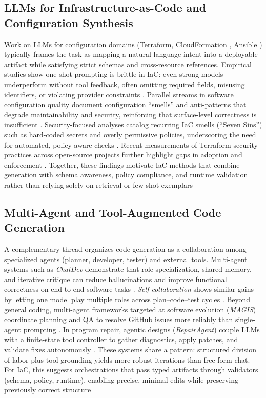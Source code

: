 \documentclass[acmsmall,screen,review,anonymous]{acmart}
\begin{document}
\subsection{LLMs for Infrastructure-as-Code and Configuration Synthesis}
Work on LLMs for configuration domains (Terraform\cite{shirinkin2017getting}, CloudFormation \cite{tovmasyan2020mastering}, Ansible \cite{mcallister2017implementing}) typically frames the task as mapping a natural-language intent into a deployable artifact while satisfying strict schemas and cross-resource references. Empirical studies show one-shot prompting is brittle in IaC: even strong models underperform without tool feedback, often omitting required fields, misusing identifiers, or violating provider constraints \cite{kon2024iac}. Parallel streams in software configuration quality document configuration ``smells'' and anti-patterns that degrade maintainability and security, reinforcing that surface-level correctness is insufficient \cite{sharma2016does,schwarz2018code}. Security-focused analyses catalog recurring IaC smells (``Seven Sins'') such as hard-coded secrets and overly permissive policies, underscoring the need for automated, policy-aware checks \cite{opara2025chaos}. Recent measurements of Terraform security practices across open-source projects further highlight gaps in adoption and enforcement \cite{verdet2023exploring}. Together, these findings motivate IaC methods that combine generation with schema awareness, policy compliance, and runtime validation rather than relying solely on retrieval or few-shot exemplars

\subsection{Multi-Agent and Tool-Augmented Code Generation}
A complementary thread organizes code generation as a collaboration among specialized agents (planner, developer, tester) and external tools. Multi-agent systems such as \emph{ChatDev} demonstrate that role specialization, shared memory, and iterative critique can reduce hallucinations and improve functional correctness on end-to-end software tasks \cite{qian2023chatdev}. \emph{Self-collaboration} shows similar gains by letting one model play multiple roles across plan–code–test cycles \cite{dong2024self}. Beyond general coding, multi-agent frameworks targeted at software evolution (\emph{MAGIS}) coordinate planning and QA to resolve GitHub issues more reliably than single-agent prompting \cite{tao2024magis}. In program repair, agentic designs (\emph{RepairAgent}) couple LLMs with a finite-state tool controller to gather diagnostics, apply patches, and validate fixes autonomously \cite{bouzenia2024repairagent}. These systems share a pattern: structured division of labor plus tool-grounding yields more robust iterations than free-form chat. For IaC, this suggests orchestrations that pass typed artifacts through validators (schema, policy, runtime), enabling precise, minimal edits while preserving previously correct structure
\end{document}
